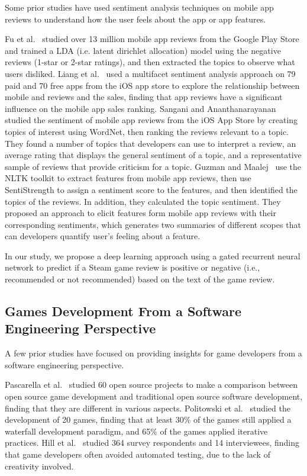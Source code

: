 \documentclass[conference]{IEEEtran}
\begin{document}
Some prior studies have used sentiment analysis techniques on mobile app reviews to understand how the user feels about the app or app features. 


Fu et al.~\cite{fu2013people} studied over 13 million mobile app reviews from the Google Play Store and trained a LDA (i.e. latent dirichlet allocation) model using the negative reviews (1-star or 2-star ratings), and then extracted the topics to observe what users disliked. Liang et al.~\cite{liang2015consumer} used a multifacet sentiment analysis approach on 79 paid and 70 free apps from the iOS app store to explore the relationship between mobile and reviews and the sales, finding that app reviews have a significant influence on the mobile app sales ranking. Sangani and Ananthanarayanan~\cite{sangani2013sentiment} studied the sentiment of mobile app reviews from the iOS App Store by creating topics of interest using WordNet, then ranking the reviews relevant to a topic. They found a number of topics that developers can use to interpret a review, an average rating that displays the general sentiment of a topic, and a representative sample of reviews that provide criticism for a topic. Guzman and Maalej~\cite{guzman2014users} use the NLTK toolkit to extract features from mobile app reviews, then use SentiStrength to assign a sentiment score to the features, and then identified the topics of the reviews. In addition, they calculated the topic sentiment. They proposed an approach to elicit features form mobile app reviews with their corresponding sentiments, which generates two summaries of different scopes that can developers quantify user's feeling about a feature.

In our study, we propose a deep learning approach using a gated recurrent neural network to predict if a Steam game review is positive or negative (i.e., recommended or not recommended) based on the text of the game review.


\subsection{Games Development From a Software Engineering Perspective}

A few prior studies have focused on providing insights for game developers from a software engineering perspective. 

 
Pascarella et al.~\cite{pascarella2018video} studied 60 open source projects to make a comparison between open source game development and traditional open source software development, finding that they are different in various aspects. Politowski et al.~\cite{asurveyonactualsoftwareengineeringprocesses} studied the development of 20 games, finding that at least 30\% of the games still applied a waterfall development paradigm, and 65\% of the games applied iterative practices. Hill et al.~\cite{videogamedevelopmentdifferentfromsoftwaredev} studied 364 survey respondents and 14 interviewees, finding that game developers often avoided automated testing, due to the lack of creativity involved.
	
\end{document}
